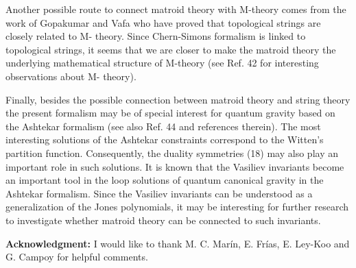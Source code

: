 \documentclass[a4paper,12pt]{article}
\begin{document}
Another possible route to connect matroid theory with M-theory comes from
the work of Gopakumar and Vafa\coordHE{} who have proved that topological
strings are closely related to M- theory. Since Chern-Simons formalism is
linked to topological strings,\coordHE{} it seems that we are closer to make
the matroid theory the underlying mathematical structure of M-theory (see
Ref. 42 for interesting observations about M- theory).

Finally, besides the possible connection between matroid theory and string
theory the present formalism may be of special interest for quantum gravity
based on the Ashtekar formalism\coordHE{} (see also Ref. 44 and references
therein). The most interesting solutions of the Ashtekar constraints
correspond to the Witten's partition function. Consequently, the duality
symmetries (18) may also play an important role in such solutions. It is
known that the Vasiliev invariants become an important tool in the loop
solutions of quantum canonical gravity in the Ashtekar formalism. Since the
Vasiliev invariants can be understood as a generalization of the Jones
polynomials, it may be interesting for further research to investigate
whether matroid theory can be connected to such invariants.

\bigskip

\noindent \textbf{Acknowledgment:} I would like to thank M. C. Mar\'{i}n, E.
Fr\'{i}as, E. Ley-Koo and G. Campoy for helpful comments.

\bigskip
\end{document}
